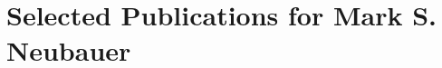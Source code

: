 \documentclass{arcpubs}
\begin{document}
\section*{Selected Publications for Mark S. Neubauer}

\nocite{*}
\showbooks
\showchapters
\showarticles
\showproceedings

\end{document}
